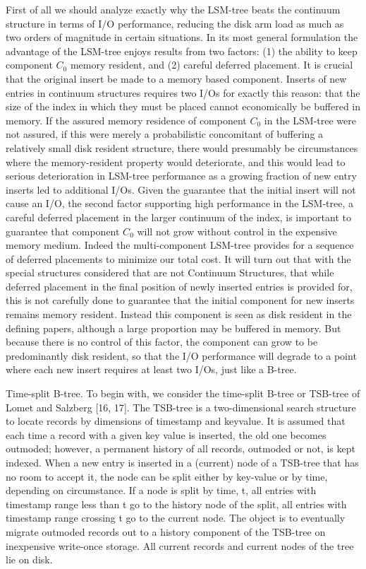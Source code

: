 \documentclass[a4paper,12pt,notitlepage,twoside,openright]{article}
\begin{document}
First of all we should analyze exactly why the LSM-tree beats the
continuum structure in terms of I/O performance, reducing the disk arm
load as much as two orders of magnitude in certain situations. In its
most general formulation the advantage of the LSM-tree enjoys results
from two factors: (1) the ability to keep component \(C_0\) memory resident,
and (2) careful deferred placement. It is crucial that the original
insert be made to a memory based component. Inserts of new entries in
continuum structures requires two I/Os for exactly this reason: that the
size of the index in which they must be placed cannot economically be
buffered in memory. If the assured memory residence of component \(C_0\) in
the LSM-tree were not assured, if this were merely a probabilistic
concomitant of buffering a relatively small disk resident structure,
there would presumably be circumstances where the memory-resident
property would deteriorate, and this would lead to serious deterioration
in LSM-tree performance as a growing fraction of new entry inserts led
to additional I/Os. Given the guarantee that the initial insert will not
cause an I/O, the second factor supporting high performance in the
LSM-tree, a careful deferred placement in the larger continuum of the
index, is important to guarantee that component \(C_0\) will not grow without
control in the expensive memory medium. Indeed the multi-component
LSM-tree provides for a sequence of deferred placements to minimize our
total cost. It will turn out that with the special structures considered
that are not Continuum Structures, that while deferred placement in the
final position of newly inserted entries is provided for, this is not
carefully done to guarantee that the initial component for new inserts
remains memory resident. Instead this component is seen as disk resident
in the defining papers, although a large proportion may be buffered in
memory. But because there is no control of this factor, the component
can grow to be predominantly disk resident, so that the I/O performance
will degrade to a point where each new insert requires at least two
I/Os, just like a B-tree.

Time-split B-tree. To begin with, we consider the time-split B-tree or
TSB-tree of Lomet and Salzberg {[}16, 17{]}. The TSB-tree is a
two-dimensional search structure to locate records by dimensions of
timestamp and keyvalue. It is assumed that each time a record with a
given key value is inserted, the old one becomes outmoded; however, a
permanent history of all records, outmoded or not, is kept indexed. When
a new entry is inserted in a (current) node of a TSB-tree that has no
room to accept it, the node can be split either by key-value or by time,
depending on circumstance. If a node is split by time, t, all entries
with timestamp range less than t go to the history node of the split,
all entries with timestamp range crossing t go to the current node. The
object is to eventually migrate outmoded records out to a history
component of the TSB-tree on inexpensive write-once storage. All current
records and current nodes of the tree lie on disk.
\end{document}
